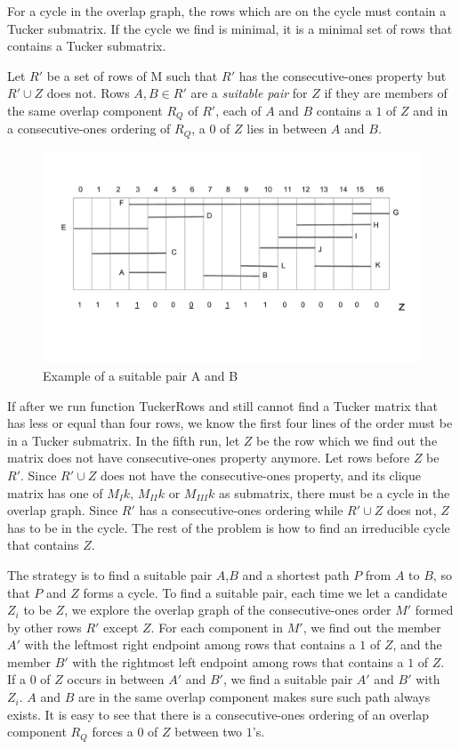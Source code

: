 For a cycle in the overlap graph, the rows which are on the cycle must contain a Tucker submatrix. If the cycle we find is minimal, it is a minimal set of rows that contains a Tucker submatrix. 

\begin{definition}
\label{sp}
Let $R'$ be a set of rows of M such that $R'$ has the consecutive-ones property but $R'\cup{Z}$ does not. Rows $A, B \in R'$ are a \emph{suitable pair} for $Z$ if they are members of the same overlap component $R_Q$ of $R'$, each of $A$ and $B$ contains a $1$ of $Z$ and in a consecutive-ones ordering of $R_Q$, a $0$ of $Z$ lies in between $A$ and $B$.
\end{definition}

\begin{figure}[H]
\centering
\includegraphics[width=12cm]{figures/lm_2.pdf}
\caption{Example of a suitable pair A and B}
\label{lm_2}
\end{figure}

If after we run function TuckerRows and still cannot find a Tucker matrix that has less or equal than four rows, we know the first four lines of the order must be in a Tucker submatrix. In the fifth run, let $Z$ be the row which we find out the matrix does not have consecutive-ones property anymore. Let rows before $Z$ be $R'$. Since $R'\cup{Z}$ does not have the consecutive-ones property, and its clique matrix has one of $M_I{k}$, $M_{II}{k}$ or $M_{III}{k}$ as submatrix, there must be a cycle in the overlap graph. Since $R'$ has a consecutive-ones ordering while $R'\cup{Z}$ does not, $Z$ has to be in the cycle. The rest of the problem is how to find an irreducible cycle that contains $Z$. 

The strategy is to find a suitable pair {$A$,$B$} and a shortest path $P$ from $A$ to $B$, so that $P$ and $Z$ forms a cycle. To find a suitable pair, each time we let a candidate $Z_i$ to be $Z$, we explore the overlap graph of the consecutive-ones order $M'$ formed by other rows $R'$ except $Z$. For each component in $M'$, we find out the member $A'$ with the leftmost right endpoint among rows that contains a $1$ of $Z$, and the member $B'$ with the rightmost left endpoint among rows that contains a $1$ of $Z$. If a $0$ of $Z$ occurs in between $A'$ and $B'$, we find a suitable pair $A'$ and $B'$ with $Z_i$. $A$ and $B$ are in the same overlap component makes sure such path always exists. It is easy to see that there is a consecutive-ones ordering of an overlap component $R_Q$ forces a $0$ of $Z$ between two $1$'s.

